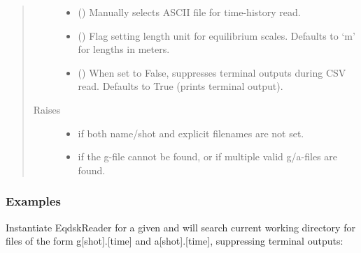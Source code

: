 \documentclass[letterpaper,10pt,english]{sphinxmanual}
\begin{document}
\begin{fulllineitems}
\begin{quote}
\begin{description}
\begin{itemize}
\item {} 
 () \textendash{} Manually selects ASCII file for time-history read.

\item {} 
 () \textendash{} Flag setting length unit for equilibrium scales.
Defaults to ‘m’ for lengths in meters.

\item {} 
 () \textendash{} When set to False, suppresses terminal outputs during
CSV read.  Defaults to True (prints terminal output).

\end{itemize}

\item[{Raises}] \leavevmode\begin{itemize}
\item {} 
 \textendash{} if both name/shot and explicit filenames are not set.

\item {} 
 \textendash{} if the g-file cannot be found, or if multiple valid
    g/a-files are found.

\end{itemize}

\end{description}\end{quote}
\subsubsection*{Examples}

Instantiate EqdskReader for a given  and  \textendash{} will search current
working directory for files of the form g{[}shot{]}.{[}time{]} and
a{[}shot{]}.{[}time{]}, suppressing terminal outputs:

\begin{sphinxVerbatim}[commandchars=\\\{\}]
  
\end{sphinxVerbatim}


\end{fulllineitems}
\end{document}
